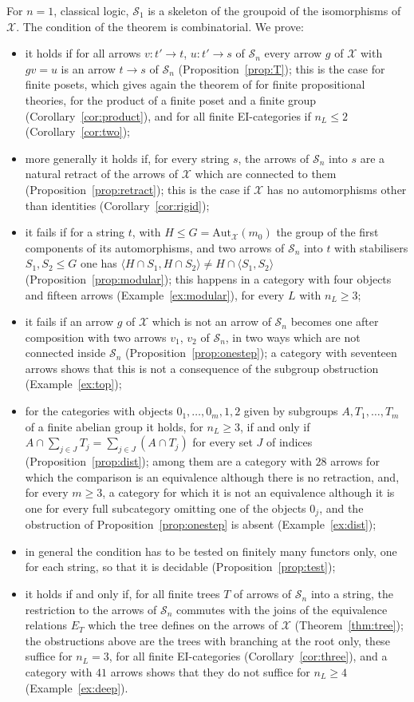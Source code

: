 \documentclass[11pt]{amsart}
\theoremstyle{definition}
\newcommand{\Aut}{\mathrm{Aut}}
\newcommand{\cX}{\mathcal X}
\newcommand{\cS}{\mathcal S}
\begin{document}
For $n=1$, classical logic, $\cS_1$ is a skeleton of the groupoid of
the isomorphisms of $\cX$. The condition of the theorem is combinatorial.
We prove:
\begin{itemize}
\item it holds if for all arrows $v\colon t'\to t$, $u\colon t'\to s$
of $\cS_n$ every arrow $g$ of $\cX$ with $gv=u$ is an arrow $t\to s$ of
$\cS_n$ (Proposition~\ref{prop:T}); this is the case for finite posets,
which gives again the theorem of \cite{Interm} for finite propositional
theories, for the product of a finite poset and a finite group
(Corollary~\ref{cor:product}), and for all finite EI-categories if
$n_L\le2$ (Corollary~\ref{cor:two});
\item more generally it holds if, for every string $s$, the arrows of
$\cS_n$ into $s$ are a natural retract of the arrows of $\cX$ which are
connected to them (Proposition~\ref{prop:retract}); this is the case
if $\cX$ has no automorphisms other than identities
(Corollary~\ref{cor:rigid});
\item it fails if for a string $t$, with $H\le G=\Aut_{\cX}(m_0)$ the
group of the first components of its automorphisms, and two arrows of $\cS_n$ into $t$ with
stabilisers $S_1,S_2\le G$ one has $\langle H\cap S_1,H\cap S_2\rangle
\ne H\cap\langle S_1,S_2\rangle$ (Proposition~\ref{prop:modular}); this
happens in a category with four objects and fifteen arrows
(Example~\ref{ex:modular}), for every $L$ with $n_L\ge3$;
\item it fails if an arrow $g$ of $\cX$ which is not an arrow of
$\cS_n$ becomes one after composition with two arrows $v_1$, $v_2$ of
$\cS_n$, in two ways which are not connected inside $\cS_n$
(Proposition~\ref{prop:onestep}); a category with seventeen arrows
shows that this is not a consequence of the subgroup obstruction
(Example~\ref{ex:top});
\item for the categories with objects $0_1,\dots,0_m,1,2$ given by
subgroups $A,T_1,\dots,T_m$ of a finite abelian group it holds, for
$n_L\ge3$, if and only if $A\cap\sum_{j\in J}T_j=\sum_{j\in J}(A\cap
T_j)$ for every set $J$ of indices (Proposition~\ref{prop:dist}); among
them are a category with $28$ arrows for which the comparison is an
equivalence although there is no retraction, and, for every $m\ge3$, a
category for which it is not an equivalence although it is one for
every full subcategory omitting one of the objects $0_j$, and the
obstruction of Proposition~\ref{prop:onestep} is absent
(Example~\ref{ex:dist});
\item in general the condition has to be tested on finitely many
functors only, one for each string, so that it is decidable
(Proposition~\ref{prop:test});
\item it holds if and only if, for all finite trees $T$ of arrows of
$\cS_n$ into a string, the restriction to the arrows of $\cS_n$
commutes with the joins of the equivalence relations $E_T$ which the
tree defines on the arrows of $\cX$ (Theorem~\ref{thm:tree}); the
obstructions above are the trees with branching at the root only,
these suffice for $n_L=3$, for all finite EI-categories
(Corollary~\ref{cor:three}), and a category with $41$ arrows shows
that they do not suffice for $n_L\ge4$ (Example~\ref{ex:deep}).
\end{itemize}
\end{document}
